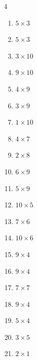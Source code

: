 \begin{multicols}{4}
\begin{enumerate}
  \item $5\times 3$
        \phantom{$=15$}

  \item $5\times 3$
        \phantom{$=15$}

  \item $3\times 10$
        \phantom{$=30$}

  \item $9\times 10$
        \phantom{$=90$}

  \item $4\times 9$
        \phantom{$=36$}

  \item $3\times 9$
        \phantom{$=27$}

  \item $1\times 10$
        \phantom{$=10$}

  \item $4\times 7$
        \phantom{$=28$}

  \item $2\times 8$
        \phantom{$=16$}

  \item $6\times 9$
        \phantom{$=54$}

  \item $5\times 9$
        \phantom{$=45$}

  \item $10\times 5$
        \phantom{$=50$}

  \item $7\times 6$
        \phantom{$=42$}

  \item $10\times 6$
        \phantom{$=60$}

  \item $9\times 4$
        \phantom{$=36$}

  \item $9\times 4$
        \phantom{$=36$}

  \item $7\times 7$
        \phantom{$=49$}

\columnbreak %

  \item $9\times 4$
        \phantom{$=36$}

  \item $5\times 4$
        \phantom{$=20$}

  \item $3\times 5$
        \phantom{$=15$}

  \item $2\times 1$
        \phantom{$=2$}


\end{enumerate}
\end{multicols}
